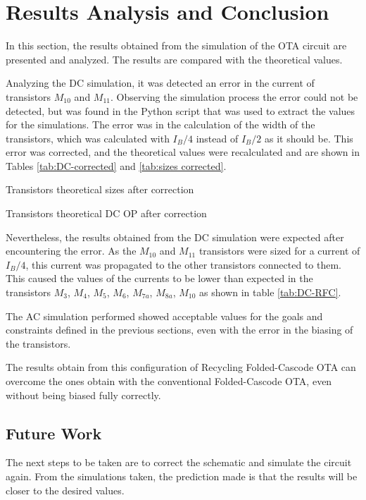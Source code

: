 \section{Results Analysis and Conclusion}

In this section, the results obtained from the simulation of the OTA circuit are presented and analyzed. The results are compared with the theoretical values.

Analyzing the DC simulation, it was detected an error in the current of transistors $M_10$ and $M_11$. Observing the simulation process the error could not be detected, but was found in the Python script that was used to extract the values for the simulations. The error was in the calculation of the width of the transistors, which was calculated with $I_B/4$ instead of $I_B/2$ as it should be. This error was corrected, and the theoretical values were recalculated and are shown in Tables \ref{tab:DC-corrected} and \ref{tab:sizes corrected}.

\begin{table}[H]
    \centering
    \caption{Transistors theoretical sizes after correction}
    \label{tab:sizes corrected}
\end{table}

\begin{table}[H]
    \centering
    \caption{Transistors theoretical DC OP after correction}
    \label{tab:DC-corrected}
\end{table}

Nevertheless, the results obtained from the DC simulation were expected after encountering the error. As the $M_{10}$ and $M_{11}$ transistors were sized for a current of $I_B/4$, this current was propagated to the other transistors connected to them. This caused the values of the currents to be lower than expected in the transistors $M_3$, $M_4$, $M_5$, $M_6$, $M_{7a}$, $M_{8a}$, $M_{10}$ as shown in table \ref{tab:DC-RFC}.

The AC simulation performed showed acceptable values for the goals and constraints defined in the previous sections, even with the error in the biasing of the transistors.

The results obtain from this configuration of Recycling Folded-Cascode OTA can overcome the ones obtain with the conventional Folded-Cascode OTA, even without being biased fully correctly.

\subsection{Future Work}

The next steps to be taken are to correct the schematic and simulate the circuit again. From the simulations taken, the prediction made is that the results will be closer to the desired values. 